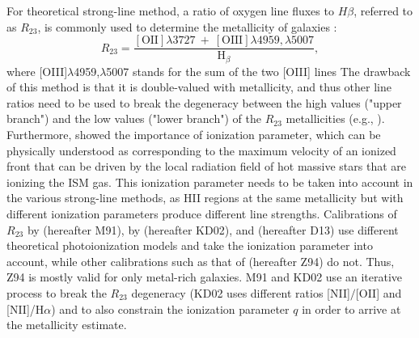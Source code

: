 \documentclass{emulateapj}
\newcommand{\ha}{H$\alpha$}
\begin{document}
For theoretical strong-line method, a ratio of oxygen line fluxes to $H\beta$, referred to as $R_{23}$, is commonly used to determine the metallicity of galaxies  \citep{pagel79}:
$$R_{23}=\frac{\mathrm{[OII]} \lambda 3727~+~\mathrm{[OIII]} \lambda 4959,\lambda 5007}{\mathrm{H}_\beta},$$ 
where [OIII]$\lambda$4959,$\lambda$5007 stands for the sum of the two [OIII] lines
 The drawback of this method is that it is double-valued with metallicity, and thus other line ratios need to be used to break the degeneracy between the high values ("upper branch") and the low values ("lower branch") of the $R_{23}$ metallicities (e.g., \citealt{kewley08}). 
Furthermore, \citet{kewley02} showed the importance of ionization parameter, which can be physically understood as corresponding to the maximum velocity of an ionized front that can be driven by the local radiation field of hot massive stars that are ionizing the ISM gas. This ionization parameter needs to be taken into account in the various strong-line methods, as HII regions at the same metallicity but with different ionization parameters produce different line strengths. Calibrations of $R_{23}$ by \citet{mcgaugh91} (hereafter M91), by \citet{kewley02} (hereafter KD02),  and \citet{dopita13} (hereafter D13) use different theoretical photoionization models and take the ionization parameter into account, while other calibrations such as that of \citet{zaritsky94} (hereafter Z94) do not. Thus, Z94 is mostly valid for only metal-rich galaxies.  M91 and KD02 use an iterative process to break the $R_{23}$ degeneracy  (KD02 uses different ratios [NII]$/$[OII] and [NII]/\ha) and to also constrain the ionization parameter $q$ in order to arrive at the metallicity estimate.
\end{document}
